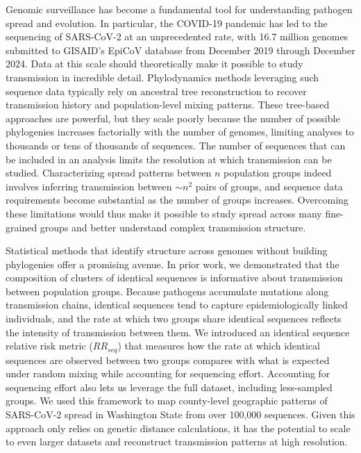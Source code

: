 \documentclass[11pt, letterpaper, oneside]{article}
\begin{document}
Genomic surveillance has become a fundamental tool for understanding pathogen spread and evolution.
In particular, the COVID-19 pandemic has led to the sequencing of SARS-CoV-2 at an unprecedented rate, with 16.7 million genomes submitted to GISAID's EpiCoV database from December 2019 through December 2024.\autocite{khareGISAIDsRolePandemic2021}
Data at this scale should theoretically make it possible to study transmission in incredible detail.
Phylodynamics methods leveraging such sequence data typically rely on ancestral tree reconstruction to recover transmission history and population-level mixing patterns.\autocite{dengGenomicSurveillanceReveals2020,neherNextfluRealtimeTracking2015}
These tree-based approaches are powerful, but they scale poorly because the number of possible phylogenies increases factorially with the number of genomes, limiting analyses to thousands or tens of thousands of sequences.
The number of sequences that can be included in an analysis limits the resolution at which transmission can be studied.
Characterizing spread patterns between $n$ population groups indeed involves inferring transmission between $\sim n^2$ pairs of groups, and sequence data requirements become substantial as the number of groups increases.
Overcoming these limitations would thus make it possible to study spread across many fine-grained groups and better understand complex transmission structure.

Statistical methods that identify structure across genomes without building phylogenies \autocite{mattesonGenomicSurveillanceReveals2023,sobkowiakCov2clustersGenomicClustering2022,cahuantziUnsupervisedIdentificationSignificant2024,nanduriDimensionalityReductionDistills2024} offer a promising avenue.
In prior work, we demonstrated that the composition of clusters of identical sequences is informative about transmission between population groups.\autocite{tran-kiemFinescalePatternsSARSCoV22025a}
Because pathogens accumulate mutations along transmission chains, identical sequences tend to capture epidemiologically linked individuals, and the rate at which two groups share identical sequences reflects the intensity of transmission between them.
We introduced an identical sequence relative risk metric ($RR_{seq}$) that measures how the rate at which identical sequences are observed between two groups compares with what is expected under random mixing while accounting for sequencing effort.
Accounting for sequencing effort also lets us leverage the full dataset, including less-sampled groups.
We used this framework to map county-level geographic patterns of SARS-CoV-2 spread in Washington State from over 100,000 sequences.
Given this approach only relies on genetic distance calculations, it has the potential to scale to even larger datasets and reconstruct transmission patterns at high resolution.
\end{document}
